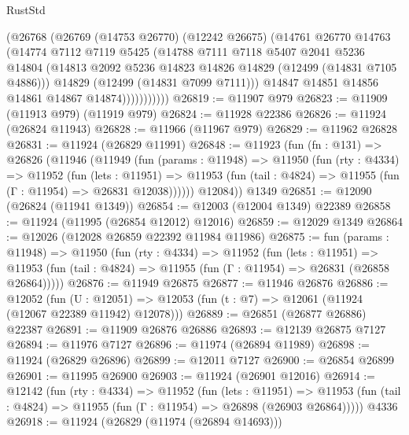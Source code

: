 \begin{lexlean}{RustStd}
\begin{coremodule}
                  (@26768
                    (@26769
                      (@14753 @26770)
                      (@12242 @26675)
                      (@14761
                        @26770
                        @14763
                        (@14774
                          @7112
                          @7119
                          @5425
                          (@14788
                            @7111
                            @7118
                            @5407
                            @2041
                            @5236
                            @14804
                            (@14813 @2092 @5236 @14823 @14826 @14829 (@12499 (@14831 @7105 @4886)))
                            @14829
                            (@12499 (@14831 @7099 @7111)))
                          @14847
                          @14851
                          @14856
                          @14861
                          @14867
                          @14874)))))))))))
@26819 := @11907 @979
@26823 := @11909 (@11913 @979) (@11919 @979)
@26824 := @11928 @22386
@26826 := @11924 (@26824 @11943)
@26828 := @11966 (@11967 @979)
@26829 := @11962 @26828
@26831 := @11924 (@26829 @11991)
@26848 := @11923
    (fun (fn : @131) =>
    @26826
      (@11946
        (@11949
          (fun (params : @11948) =>
          @11950
            (fun (rty : @4334) =>
            @11952
              (fun (lets : @11951) =>
              @11953 (fun (tail : @4824) => @11955 (fun (Γ : @11954) => @26831 @12038))))))
        @12084))
    @1349
@26851 := @12090 (@26824 (@11941 @1349))
@26854 := @12003 (@12004 @1349) @22389
@26858 := @11924 (@11995 (@26854 @12012) @12016)
@26859 := @12029 @1349
@26864 := @12026 (@12028 @26859 @22392 @11984 @11986)
@26875 := fun (params : @11948) =>
  @11950
    (fun (rty : @4334) =>
    @11952
      (fun (lets : @11951) =>
      @11953 (fun (tail : @4824) => @11955 (fun (Γ : @11954) => @26831 (@26858 @26864)))))
@26876 := @11949 @26875
@26877 := @11946 @26876
@26886 := @12052
    (fun (U : @12051) => @12053 (fun (t : @7) => @12061 (@11924 (@12067 @22389 @11942) @12078)))
@26889 := @26851 (@26877 @26886) @22387
@26891 := @11909 @26876 @26886
@26893 := @12139 @26875 @7127
@26894 := @11976 @7127
@26896 := @11974 (@26894 @11989)
@26898 := @11924 (@26829 @26896)
@26899 := @12011 @7127
@26900 := @26854 @26899
@26901 := @11995 @26900
@26903 := @11924 (@26901 @12016)
@26914 := @12142
    (fun (rty : @4334) =>
    @11952
      (fun (lets : @11951) =>
      @11953 (fun (tail : @4824) => @11955 (fun (Γ : @11954) => @26898 (@26903 @26864)))))
    @4336
@26918 := @11924 (@26829 (@11974 (@26894 @14693)))

\end{coremodule}
\end{lexlean}
